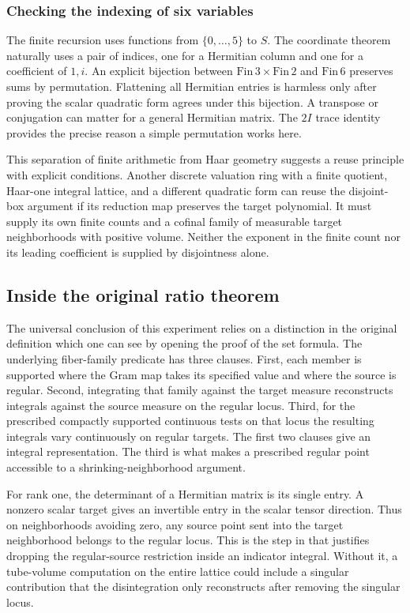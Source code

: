 \documentclass[12pt,letterpaper]{article}
\newcommand{\code}[1]{\texttt{\detokenize{#1}}}
\begin{document}
\subsubsection{Checking the indexing of six variables}
The finite recursion uses functions from $\{0,\ldots,5\}$ to $S$. The coordinate theorem naturally uses a pair of indices, one for a Hermitian column and one for a coefficient of $1,i$. An explicit bijection between $\mathrm{Fin}\,3\times\mathrm{Fin}\,2$ and $\mathrm{Fin}\,6$ preserves sums by permutation. Flattening all Hermitian entries is harmless only after proving the scalar quadratic form agrees under this bijection. A transpose or conjugation can matter for a general Hermitian matrix. The $2I$ trace identity provides the precise reason a simple permutation works here.
\par
This separation of finite arithmetic from Haar geometry suggests a reuse principle with explicit conditions. Another discrete valuation ring with a finite quotient, Haar-one integral lattice, and a different quadratic form can reuse the disjoint-box argument if its reduction map preserves the target polynomial. It must supply its own finite counts and a cofinal family of measurable target neighborhoods with positive volume. Neither the exponent in the finite count nor its leading coefficient is supplied by disjointness alone.
\subsection{Inside the original ratio theorem}
The universal conclusion of this experiment relies on a distinction in the original definition which one can see by opening the proof of the set formula. The underlying fiber-family predicate has three clauses. First, each member is supported where the Gram map takes its specified value and where the source is regular. Second, integrating that family against the target measure reconstructs integrals against the source measure on the regular locus. Third, for the prescribed compactly supported continuous tests on that locus the resulting integrals vary continuously on regular targets. The first two clauses give an integral representation. The third is what makes a prescribed regular point accessible to a shrinking-neighborhood argument.
\par
For rank one, the determinant of a Hermitian matrix is its single entry. A nonzero scalar target gives an invertible entry in the scalar tensor direction. Thus on neighborhoods avoiding zero, any source point sent into the target neighborhood belongs to the regular locus. This is the step in \code{mass_eq_lintegral} that justifies dropping the regular-source restriction inside an indicator integral. Without it, a tube-volume computation on the entire lattice could include a singular contribution that the disintegration only reconstructs after removing the singular locus.
\end{document}

